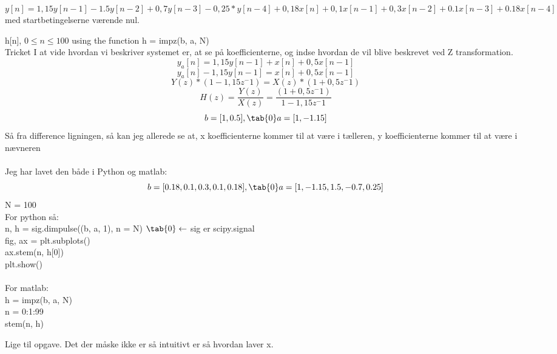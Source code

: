 \begin{Opgaver}
\begin{kapitel}
        \begin{Opgave}
            \[y[n] = 1,15y[n-1] - 1.5y[n-2] + 0,7y[n-3] - 0,25*y[n-4] + 0,18x[n] +0,1x[n-1] + 0,3x[n-2] + 0.1x[n-3] + 0.18x[n-4]\]
            med startbetingelserne værende nul. 
            \begin{UnderOpgave}
                h[n],  $0 \leq n \leq 100$ using the function h = impz(b, a, N)\\
                Tricket I at vide hvordan vi beskriver systemet er, at se på koefficienterne, og indse hvordan de vil blive beskrevet ved Z transformation.
                \[y_a[n] = 1,15y[n-1] + x[n] + 0,5x[n-1]\]
                \[y_a[n] - 1,15y[n-1] = x[n] + 0,5x[n-1]\]
                \[Y(z)*(1 - 1,15z^-1) = X(z) * (1 + 0,5z^-1)\]
                \[H(z) = \frac{Y(z)}{X(z)} = \frac{(1 + 0,5z^-1)}{1 - 1,15z^-1}\]
                \[b = [1, 0.5], \tab{0} a = [1, -1.15]\]
                Så fra difference ligningen, så kan jeg allerede se at, x koefficienterne kommer til at være i tælleren, y koefficienterne kommer til at være i nævneren
                \\ \\ Jeg har lavet den både i Python og matlab: 
                \[b = [0.18, 0.1, 0.3, 0.1, 0.18],\tab{0} a = [1, -1.15, 1.5, -0.7, 0.25]\]
                N = 100\\
                For python så:\\
                n, h = sig.dimpulse((b, a, 1), n = N) $\tab{0} \leftarrow$ sig er scipy.signal\\ 
                fig, ax = plt.subplots()\\
                ax.stem(n, h[0])\\
                plt.show()\\
                \\
                For matlab: \\
                h = impz(b, a, N) \\
                n = 0:1:99\\
                stem(n, h)\\
            \end{UnderOpgave}
            \begin{UnderOpgave}[Beregn og plot output med \text{x[n] = u[n]}]
                Lige til opgave. Det der måske ikke er så intuitivt er så hvordan laver x. 

\end{UnderOpgave}
\end{Opgave}
\end{kapitel}
\end{Opgaver}
